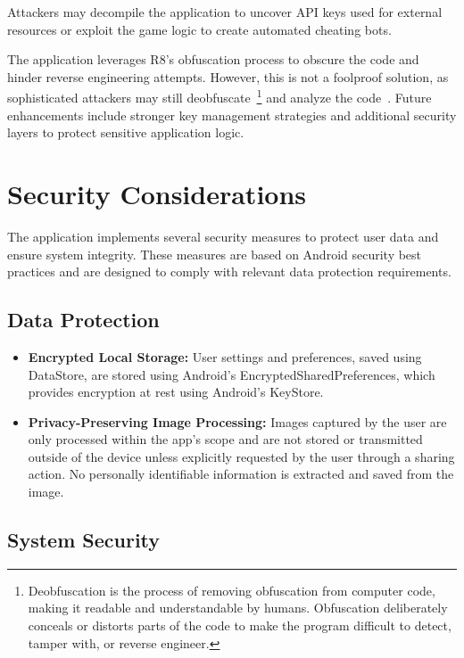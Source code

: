 Attackers may decompile the application to uncover API keys used for external resources or exploit the game logic to create automated cheating bots. 

The application leverages R8's obfuscation process to obscure the code and hinder reverse engineering attempts. However, this is not a foolproof solution, as sophisticated attackers may still deobfuscate~\footnote{Deobfuscation is the process of removing obfuscation from computer code, making it readable and understandable by humans. Obfuscation deliberately conceals or distorts parts of the code to make the program difficult to detect, tamper with, or reverse engineer.} and analyze the code~\cite{bib:android_obfuscation}. Future enhancements include stronger key management strategies and additional security layers to protect sensitive application logic.


\section{Security Considerations}

The application implements several security measures to protect user data and ensure system integrity. These measures are based on Android security best practices and are designed to comply with relevant data protection requirements.

\subsection{Data Protection}

\begin{itemize}
    \item \textbf{Encrypted Local Storage:} User settings and preferences, saved using DataStore, are stored using Android's EncryptedSharedPreferences, which provides encryption at rest using Android's KeyStore.
    \item \textbf{Privacy-Preserving Image Processing:} Images captured by the user are only processed within the app's scope and are not stored or transmitted outside of the device unless explicitly requested by the user through a sharing action. No personally identifiable information is extracted and saved from the image.
\end{itemize}

\subsection{System Security}


